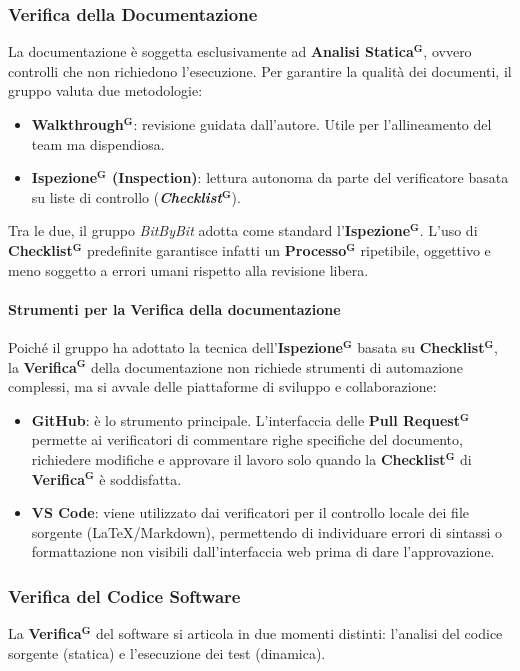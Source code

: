 \documentclass[a4paper,12pt]{article}
\newcommand{\term}[1]{\textbf{#1}$^\mathbf{G}$}
\newcommand{\ignoreglossary}{}
\begin{document}
\subsubsection{\ignoreglossary{Verifica} della Documentazione}
La documentazione è soggetta esclusivamente ad \textbf{\term{Analisi Statica}}, ovvero controlli che non richiedono l'esecuzione.
Per garantire la qualità dei documenti, il gruppo valuta due metodologie:
\begin{itemize}
    \item \textbf{\term{Walkthrough}}: revisione guidata dall'autore. Utile per l'allineamento del team ma dispendiosa.
    \item \textbf{\term{Ispezione} (Inspection)}: lettura autonoma da parte del verificatore basata su liste di controllo (\textit{\term{Checklist}}).
\end{itemize}
Tra le due, il gruppo \textit{BitByBit} adotta come standard l'\textbf{\term{Ispezione}}. L'uso di \term{Checklist} predefinite garantisce infatti un \term{Processo} ripetibile, oggettivo e meno soggetto a errori umani rispetto alla revisione libera.

\paragraph{Strumenti per la \ignoreglossary{Verifica} della documentazione}
Poiché il gruppo ha adottato la tecnica dell'\textbf{\term{Ispezione}} basata su \term{Checklist}, la \term{Verifica} della documentazione non richiede strumenti di automazione complessi, ma si avvale delle piattaforme di sviluppo e collaborazione:
\begin{itemize}
    \item \textbf{GitHub}: è lo strumento principale. L'interfaccia delle \term{Pull Request} permette ai verificatori di commentare righe specifiche del documento, richiedere modifiche e approvare il lavoro solo quando la \term{Checklist} di \term{Verifica} è soddisfatta.
    \item \textbf{VS Code}: viene utilizzato dai verificatori per il controllo locale dei file sorgente (\LaTeX/Markdown), permettendo di individuare errori di sintassi o formattazione non visibili dall'interfaccia web prima di dare l'approvazione.
\end{itemize}

\subsubsection{\ignoreglossary{Verifica} del Codice Software}
La \term{Verifica} del software si articola in due momenti distinti: l'analisi del codice sorgente (statica) e l'esecuzione dei test (dinamica).
\end{document}
